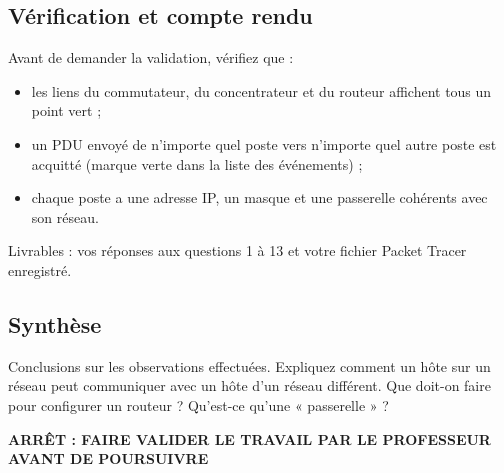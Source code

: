 \documentclass[
  french,
  10pt,
  a4paper,
]{scrartcl}
\providecommand{\tightlist}{%
  \setlength{\itemsep}{0pt}\setlength{\parskip}{0pt}}
\begin{document}
\subsection{Vérification et compte
rendu}\label{vuxe9rification-et-compte-rendu}

Avant de demander la validation, vérifiez que :

\begin{itemize}
\tightlist
\item
  les liens du commutateur, du concentrateur et du routeur affichent
  tous un point vert ;
\item
  un PDU envoyé de n'importe quel poste vers n'importe quel autre poste
  est acquitté (marque verte dans la liste des événements) ;
\item
  chaque poste a une adresse IP, un masque et une passerelle cohérents
  avec son réseau.
\end{itemize}

Livrables : vos réponses aux questions 1 à 13 et votre fichier Packet
Tracer enregistré.

\subsection{Synthèse}\label{synthuxe8se}

\begin{tcolorbox}[enhanced jigsaw, arc=.35mm, bottomrule=.15mm, bottomtitle=1mm, breakable, colback=white, colbacktitle=quarto-callout-note-color!10!white, colframe=quarto-callout-note-color-frame, coltitle=black, left=2mm, leftrule=.75mm, opacityback=0, opacitybacktitle=0.6, rightrule=.15mm, title=\textcolor{quarto-callout-note-color}{\faInfo}\hspace{0.5em}{Question 13}, titlerule=0mm, toprule=.15mm, toptitle=1mm]

Conclusions sur les observations effectuées. Expliquez comment un hôte
sur un réseau peut communiquer avec un hôte d'un réseau différent. Que
doit-on faire pour configurer un routeur ? Qu'est-ce qu'une « passerelle
» ?

\end{tcolorbox}

\begin{tcolorbox}[enhanced jigsaw, arc=.35mm, bottomrule=.15mm, bottomtitle=1mm, breakable, colback=white, colbacktitle=quarto-callout-warning-color!10!white, colframe=quarto-callout-warning-color-frame, coltitle=black, left=2mm, leftrule=.75mm, opacityback=0, opacitybacktitle=0.6, rightrule=.15mm, title=\textcolor{quarto-callout-warning-color}{\faExclamationTriangle}\hspace{0.5em}{Avertissement}, titlerule=0mm, toprule=.15mm, toptitle=1mm]

\textbf{ARRÊT : FAIRE VALIDER LE TRAVAIL PAR LE PROFESSEUR AVANT DE
POURSUIVRE}

\end{tcolorbox}
\end{document}
